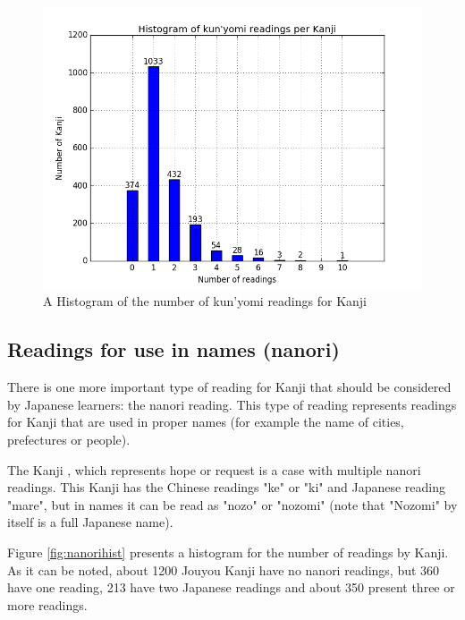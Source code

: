 \begin{figure}[ht]
    \centering
    \includegraphics[width=\textwidth]{Cap1/HistogramKunYomi}
    \caption{A Histogram of the number of kun'yomi readings for Kanji}
    \label{fig:kunyomihist}
\end{figure}

\clearpage

\subsection{Readings for use in names (nanori)}

There is one more important type of reading for Kanji that should be considered by Japanese learners: the nanori reading. This type of reading represents readings for Kanji that are used in proper names (for example the name of cities, prefectures or people). 

The Kanji , which represents hope or request is a case with multiple nanori readings. This Kanji has the Chinese readings "ke" or "ki" and Japanese reading "mare", but in names it can be read as "nozo" or "nozomi" (note that "Nozomi" by itself is a full Japanese name).

Figure \ref{fig:nanorihist} presents a histogram for the number of readings by Kanji. As it can be noted, about 1200 Jouyou Kanji have no nanori readings, but 360 have one reading, 213 have two Japanese readings and about 350 present three or more readings.

